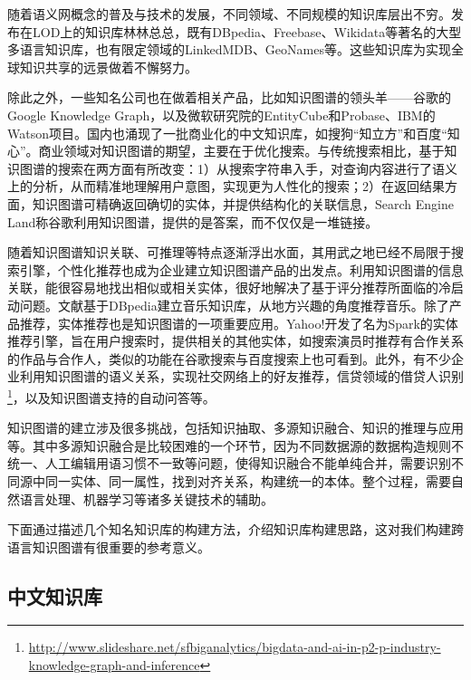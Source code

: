 随着语义网概念的普及与技术的发展，不同领域、不同规模的知识库层出不穷。发布在LOD上的知识库林林总总，既有DBpedia、Freebase、Wikidata等著名的大型多语言知识库，也有限定领域的LinkedMDB\cite{erxleben2014introducing}、GeoNames\cite{wick2011geonames}等。这些知识库为实现全球知识共享的远景做着不懈努力。

除此之外，一些知名公司也在做着相关产品，比如知识图谱的领头羊——谷歌的Google Knowledge Graph\cite{singhal2012introducing}，以及微软研究院的EntityCube\cite{nie2012statistical}和Probase\cite{wu2012probase}、IBM的Watson项目\cite{ferrucci2012introduction}。国内也涌现了一批商业化的中文知识库，如搜狗“知立方”和百度“知心”。商业领域对知识图谱的期望，主要在于优化搜索。与传统搜索相比，基于知识图谱的搜索在两方面有所改变：1）从搜索字符串入手，对查询内容进行了语义上的分析，从而精准地理解用户意图，实现更为人性化的搜索；2）在返回结果方面，知识图谱可精确返回确切的实体，并提供结构化的关联信息，Search Engine Land称谷歌利用知识图谱，提供的是答案，而不仅仅是一堆链接\cite{sullivan2012google}。

随着知识图谱知识关联、可推理等特点逐渐浮出水面，其用武之地已经不局限于搜索引擎，个性化推荐也成为企业建立知识图谱产品的出发点\cite{Burke00knowledge-basedrecommender,aggarwal2016knowledge}。利用知识图谱的信息关联，能很容易地找出相似或相关实体，很好地解决了基于评分推荐所面临的冷启动问题。文献\cite{passant2010dbrec}基于DBpedia建立音乐知识库，从地方兴趣的角度推荐音乐。除了产品推荐，实体推荐也是知识图谱的一项重要应用。Yahoo!开发了名为Spark的实体推荐引擎\cite{blanco2013entity}，旨在用户搜索时，提供相关的其他实体，如搜索演员时推荐有合作关系的作品与合作人，类似的功能在谷歌搜索与百度搜索上也可看到。此外，有不少企业利用知识图谱的语义关系，实现社交网络上的好友推荐\cite{venkataramani2012tao}，信贷领域的借贷人识别\footnote{\url{http://www.slideshare.net/sfbiganalytics/bigdata-and-ai-in-p2-p-industry-knowledge-graph-and-inference}}，以及知识图谱支持的自动问答等\cite{yih2015semantic,yang2014joint}。

知识图谱的建立涉及很多挑战，包括知识抽取、多源知识融合、知识的推理与应用等。其中多源知识融合是比较困难的一个环节，因为不同数据源的数据构造规则不统一、人工编辑用语习惯不一致等问题，使得知识融合不能单纯合并，需要识别不同源中同一实体、同一属性，找到对齐关系，构建统一的本体。整个过程，需要自然语言处理、机器学习等诸多关键技术的辅助。

下面通过描述几个知名知识库的构建方法，介绍知识库构建思路，这对我们构建跨语言知识图谱有很重要的参考意义。

\subsection{中文知识库}

